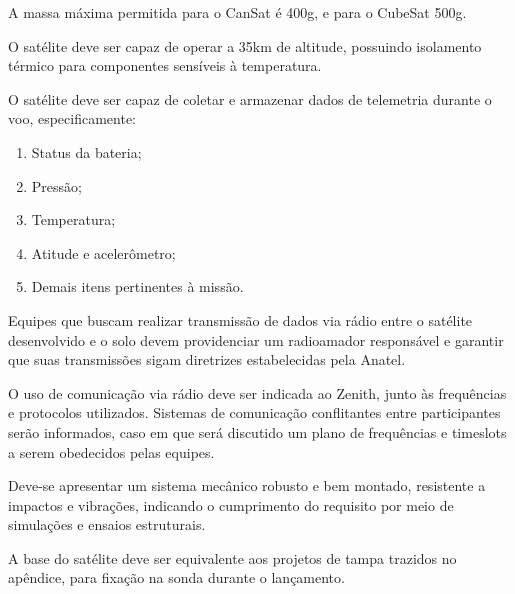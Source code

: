     \begin{definition}[2]
    A massa máxima permitida para o CanSat é 400g, e para o CubeSat 500g.
    \end{definition}

    \begin{definition}[3]
    O satélite deve ser capaz de operar a 35km de altitude, possuindo isolamento térmico para componentes sensíveis à temperatura.
    \end{definition}

    \begin{definition}[4]
    O satélite deve ser capaz de coletar e armazenar dados de telemetria durante o voo, especificamente:
    \begin{enumerate}
        \item Status da bateria;
        \item Pressão;
        \item Temperatura;
        \item Atitude e acelerômetro;
        \item Demais itens pertinentes à missão.
    \end{enumerate}
    \end{definition}

    \begin{definition}[7]
    Equipes que buscam realizar transmissão de dados via rádio entre o satélite desenvolvido e o solo devem providenciar um radioamador responsável e garantir que suas transmissões sigam diretrizes estabelecidas pela Anatel.
    
    O uso de comunicação via rádio deve ser indicada ao Zenith, junto às frequências e protocolos utilizados. Sistemas de comunicação conflitantes entre participantes serão informados, caso em que será discutido um plano de frequências e timeslots a serem obedecidos pelas equipes.
    \end{definition}

    \begin{definition}[5]
    Deve-se apresentar um sistema mecânico robusto e bem montado, resistente a impactos e vibrações, indicando o cumprimento do requisito por meio de simulações e ensaios estruturais.
    \end{definition}
    
    \begin{definition}[6]
    A base do satélite deve ser equivalente aos projetos de tampa trazidos no apêndice, para fixação na sonda durante o lançamento.
    \end{definition}

